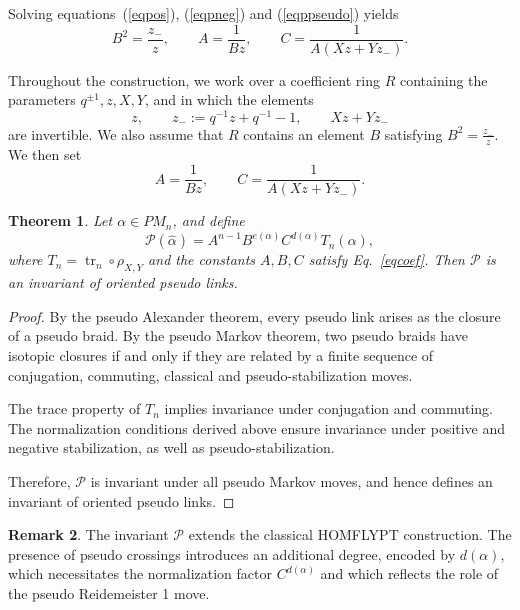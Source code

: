 \documentclass[11pt]{article}
\numberwithin{equation}{section}
\newtheorem{theorem}{Theorem}[section]
\theoremstyle{definition}
\newtheorem{remark}[theorem]{Remark}
\begin{document}
Solving equations~(\ref{eqpos}), (\ref{eqpneg}) and (\ref{eqppseudo}) yields
\begin{equation}\label{eqcoef}
B^2=\frac{z_-}{z},
\qquad
A=\frac{1}{Bz},
\qquad
C=\frac{1}{A(Xz+Yz_-)}.
\end{equation}


Throughout the construction, we work over a coefficient ring \(R\) containing
the parameters \(q^{\pm1},z,X,Y\), and in which the elements
\[
z,\qquad z_-:=q^{-1}z+q^{-1}-1,\qquad Xz+Yz_-
\]
are invertible. We also assume that \(R\) contains an element \(B\) satisfying \( B^2=\frac{z_-}{z}. \) We then set
\[
A=\frac{1}{Bz},
\qquad
C=\frac{1}{A(Xz+Yz_-)}.
\]



\begin{theorem}
Let \(\alpha \in PM_n\), and define
\[
\mathcal P(\widehat{\alpha})
=
A^{n-1} B^{e(\alpha)} C^{d(\alpha)} T_n(\alpha),
\]
where \(T_n=\operatorname{tr}_n\circ \rho_{X,Y}\) and the constants
\(A,B,C\) satisfy Eq.~\eqref{eqcoef}. Then \(\mathcal P\) is an invariant of oriented pseudo links.
\end{theorem}

\begin{proof}
By the pseudo Alexander theorem, every pseudo link arises as the closure of a pseudo braid. By the pseudo Markov theorem, two pseudo braids have isotopic closures if and only if they are related by a finite sequence of conjugation, commuting, classical and pseudo-stabilization moves.

The trace property of \(T_n\) implies invariance under conjugation and commuting. The normalization conditions derived above ensure invariance under positive and negative stabilization, as well as pseudo-stabilization.

Therefore, \(\mathcal P\) is invariant under all pseudo Markov moves, and hence defines an invariant of oriented pseudo links.
\end{proof}

\begin{remark}
The invariant \(\mathcal P\) extends the classical HOMFLYPT construction. The presence of pseudo crossings introduces an additional degree, encoded by \(d(\alpha)\), which necessitates the normalization factor \(C^{d(\alpha)}\) and which reflects the role of the pseudo Reidemeister 1 move.
\end{remark}
\end{document}

